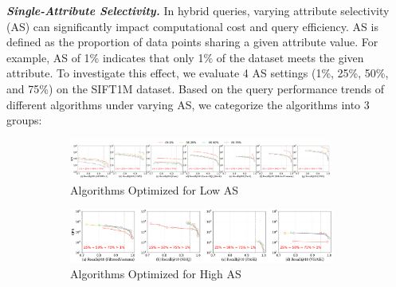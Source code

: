 \documentclass[sigconf, nonacm]{acmart}
\begin{document}
{	\textit{\textbf{Single-Attribute Selectivity.}}
	In hybrid queries, varying attribute selectivity (AS) can significantly impact computational cost and query efficiency.
	AS is defined as the proportion of data points sharing a given attribute value. For example, AS of 1\% indicates that only 1\% of the dataset meets the given attribute. 
	To investigate this effect, we evaluate 4 AS settings (1\%, 25\%, 50\%, and 75\%) on the SIFT1M dataset. 
	Based on the query performance trends of different algorithms under varying AS, we categorize the algorithms into 3 groups:
%	
	
	
	
	
	\begin{figure}
		\centering
		
		\begin{subfigure}{\textwidth}
			\centering
			
			\includegraphics[width=0.95\textwidth]{figures/exp/exp_5_2_1.pdf}
			\caption{Algorithms Optimized for Low AS}
			\label{fig:exp_5_2_1}
		\end{subfigure}
		
		\vfill %
		
		\begin{subfigure}{0.627\textwidth} %
			\centering
			
			\includegraphics[width=0.96\textwidth]{figures/exp/exp_5_2_2.pdf}
			\caption{Algorithms Optimized for High AS}
			\label{fig:exp_5_2_2}
		\end{subfigure}
		\hspace{1mm} %
		\begin{subfigure}{0.33\textwidth} %
			\centering
			

\end{subfigure}
\end{figure}}
\end{document}
